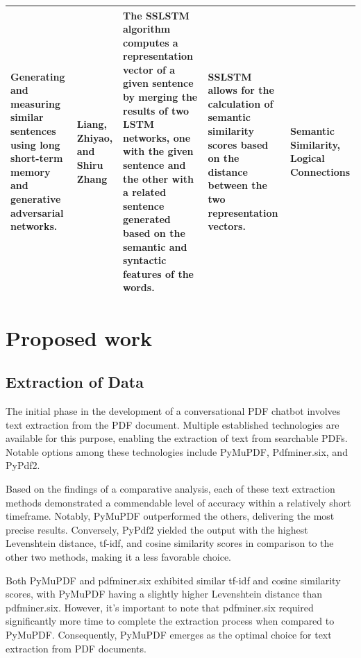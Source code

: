 \documentclass[conference]{IEEEtran}
\begin{document}
\begin{table}
\begin{center}
\begin{tabular}{ |p{2cm}|p{2cm}|p{4cm}|p{3cm}|p{4cm}| }
\hline
[17] Generating and measuring similar sentences using long short-term memory and generative adversarial networks. &  Liang, Zhiyao, and Shiru Zhang &  The SSLSTM algorithm computes a representation vector of a given sentence by merging the results of two LSTM networks, one with the given sentence and the other with a related sentence generated based on the semantic and syntactic features of the words. &  SSLSTM allows for the calculation of semantic similarity scores based on the distance between the two representation vectors. &  Semantic Similarity, Logical Connections  \\
\hline
 \hline
\end{tabular}
\end{center}
\end{table}


\section{Proposed work}

\subsection{Extraction of Data}

The initial phase in the development of a conversational PDF chatbot involves text extraction from the PDF document. Multiple established technologies are available for this purpose, enabling the extraction of text from searchable PDFs. Notable options among these technologies include PyMuPDF, Pdfminer.six, and PyPdf2.

Based on the findings of a comparative analysis, each of these text extraction methods demonstrated a commendable level of accuracy within a relatively short timeframe. Notably, PyMuPDF outperformed the others, delivering the most precise results. Conversely, PyPdf2 yielded the output with the highest Levenshtein distance, tf-idf, and cosine similarity scores in comparison to the other two methods, making it a less favorable choice.

Both PyMuPDF and pdfminer.six exhibited similar tf-idf and cosine similarity scores, with PyMuPDF having a slightly higher Levenshtein distance than pdfminer.six. However, it's important to note that pdfminer.six required significantly more time to complete the extraction process when compared to PyMuPDF. Consequently, PyMuPDF emerges as the optimal choice for text extraction from PDF documents.
\end{document}
